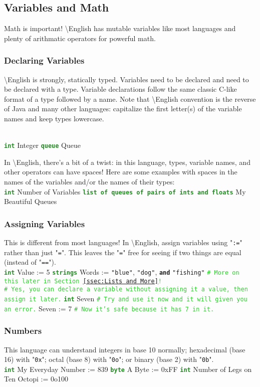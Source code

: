 \documentclass{article}
\newcommand{\English}{\textbackslash{}English}				%
\newcommand{\ssecl}[1]{\subsection{#1}\label{ssec:#1}}
\newcommand{\sssecl}[1]{\subsubsection{#1}\label{sssec:#1}}
\newcommand{\codecomment}[1]{\texttt{\textcolor{LimeGreen}{#1}}}
\newcommand{\commentline}[1]{\codecomment{\# #1}}
\newcommand{\type}[1]{\texttt{\textcolor{ForestGreen}{\textbf{#1}}}}
\newcommand{\common}[1]{\texttt{\textcolor{Mulberry}{\textbf{#1}}}}
\newcommand{\codestring}[1]{\texttt{\textcolor{NavyBlue}{"#1"}}}
\newenvironment{code}[0]
{\ttfamily{}				%
\setlength\parindent{0cm}	%
~\\}
{\setlength\parindent{1cm}
~\\}
\begin{document}
\ssecl{Variables and Math}
\indent Math is important! \English{} has mutable variables like most languages and plenty of arithmatic operators for powerful math.

\sssecl{Declaring Variables}
\indent \English{} is strongly, statically typed. Variables need to be declared and need to be declared with a type. Variable declarations follow the same classic C-like format of a type followed by a name. Note that \English{} convention is the reverse of Java and many other languages: capitalize the first letter(s) of the variable names and keep types lowercase.

\begin{code}
\type{int} Integer
\type{queue} Queue
\end{code}

In \English{}, there's a bit of a twist: in this language, types, variable names, and other operators can have spaces! Here are some examples with spaces in the names of the variables and/or the names of their types:
\begin{code}
\type{int} Number of Variables
\type{list of queues of pairs of ints and floats} My Beautiful Queues
\end{code}

\sssecl{Assigning Variables}
\indent This is different from most languages! In \English{}, assign variables using "\texttt{:=}" rather than just "\texttt{=}". This leaves the "\texttt{=}" free for seeing if two things are equal (instead of "\texttt{==}").
\begin{code}
\type{int} Value := 5
\type{strings} Words := \codestring{blue}, \codestring{dog}, \common{and} \codestring{fishing} \commentline{More on this later in Section \ref{ssec:Lists and More}!}\\
\commentline{Yes, you can declare a variable without assigning it a value, then assign it later.}
\type{int} Seven	\commentline{Try and use it now and it will given you an error.}
Seven := 7	\commentline{Now it's safe because it has 7 in it.}
\end{code}

\sssecl{Numbers}
\indent This language can understand integers in base 10 normally; hexadecimal (base 16) with "\texttt{0x}"; octal (base 8) with "\texttt{0o}"; or binary (base 2) with "\texttt{0b}".
\begin{code}
\type{int} My Everyday Number := 839
\type{byte} A Byte := 0xFF
\type{int} Number of Legs on Ten Octopi := 0o100
\end{code}
\end{document}
